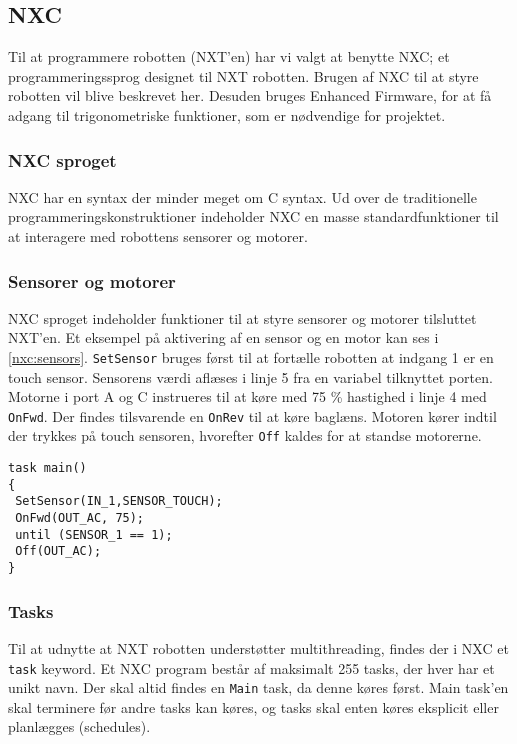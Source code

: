 \subsection{NXC}\label{nxc}
Til at programmere robotten (NXT'en) har vi valgt at benytte NXC; et programmeringssprog designet til NXT robotten. 
Brugen af NXC til at styre robotten vil blive beskrevet her.\cite{NXC}
Desuden bruges Enhanced Firmware, for at få adgang til trigonometriske funktioner, som er nødvendige for projektet.\cite{enhanced_firmware}

\subsubsection{NXC sproget}
NXC har en syntax der minder meget om C syntax. 
Ud over de traditionelle programmeringskonstruktioner indeholder NXC en masse standardfunktioner til at interagere med robottens sensorer og motorer.

\subsubsection{Sensorer og motorer}
NXC sproget indeholder funktioner til at styre sensorer og motorer tilsluttet NXT'en.
Et eksempel på aktivering af en sensor og en motor kan ses i \cref{nxc:sensors}.
\lstinline[style=c]!SetSensor! bruges først til at fortælle robotten at indgang 1 er en touch sensor. 
Sensorens værdi aflæses i linje 5 fra en variabel tilknyttet porten.
Motorne i port A og C instrueres til at køre med 75 \% hastighed i linje 4 med \lstinline[style=c]!OnFwd!.  
Der findes tilsvarende en \lstinline[style=c]!OnRev! til at køre baglæns.
Motoren kører indtil der trykkes på touch sensoren, hvorefter \lstinline[style=c]!Off! kaldes for at standse motorerne.

\begin{lstlisting}[style=c,label=nxc:sensors, caption={Brug af motorer og sensorer.}]
task main()
{
 SetSensor(IN_1,SENSOR_TOUCH);
 OnFwd(OUT_AC, 75);
 until (SENSOR_1 == 1);
 Off(OUT_AC);
}
\end{lstlisting}

\subsubsection{Tasks}
Til at udnytte at NXT robotten understøtter multithreading, findes der i NXC et \lstinline[style=c]!task! keyword.
Et NXC program består af maksimalt 255 tasks, der hver har et unikt navn. 
Der skal altid findes en \lstinline[style=c]!Main! task, da denne køres først.
Main task'en skal terminere før andre tasks kan køres, og tasks skal enten køres eksplicit eller planlægges (schedules).

